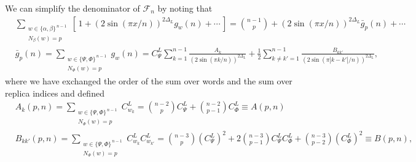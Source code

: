 \documentclass[11pt]{article}
\newcommand{\nn}{\nonumber}
\begin{document}
  We can simplify the denominator of $\mathcal{F}_{n}$ by noting that
  \begin{align}
     & \sum_{\substack{w\in\{\alpha,\beta\}^{\,n-1}\\ N_\beta(w)=p}}\left[\,1+(2\sin(\pi x/n))^{2\Delta_L}g_{w}(n)+\cdots\,\right]=\binom{n-1}{p}+(2\sin(\pi x/n))^{2\Delta_L}\bar{g}_{p}(n)+\cdots\,\nn                                   \\
    &\bar{g}_{p}(n) =\sum_{\substack{w\in\{\Psi,\Phi\}^{\,n-1}\\ N_\Phi(w)=p}}g_{w}(n)=C_{\Psi}^L\sum_{k=1}^{n-1}\frac{A_{k}}{(2\sin(\pi k/n))^{2\Delta_L}}+\frac{1}{2}\sum_{k\neq k'=1}^{n-1}\frac{B_{kk'}}{(2\sin(\pi |k-k'|/n))^{2\Delta_L}},
  \end{align}
  where we have exchanged the order of the sum over words and the sum over
  replica indices and defined
  \begin{align}
      & A_{k}(p,n)=\sum_{\substack{w\in\{\Psi,\Phi\}^{\,n-1}\\ N_\Phi(w)=p}}C_{w_k}^L=\binom{n-2}{p}C_{\Psi}^L+\binom{n-2}{p-1}C_{\Phi}^L\equiv A(p,n)\nn  \\
     & B_{kk'}(p,n)=\sum_{\substack{w\in\{\Psi,\Phi\}^{\,n-1}\\ N_\Phi(w)=p}}C_{w_k}^LC_{w_{k'}}^L=\binom{n-3}{p}{(C_{\Psi}^L)}^{2}+2\binom{n-3}{p-1}C_{\Psi}^LC_{\Phi}^L+\binom{n-3}{p-2}{(C_{\Phi}^L)}^{2}\equiv B(p,n),
  \end{align}
\end{document}
